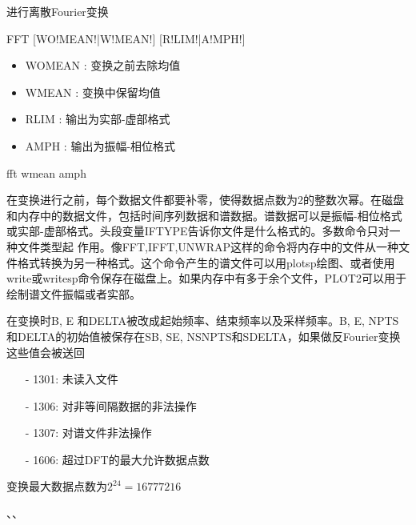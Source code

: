 \label{cmd:fft}

进行离散Fourier变换

\begin{SACSTX}
FFT [WO!MEAN!|W!MEAN!] [R!LIM!|A!MPH!]
\end{SACSTX}

\begin{itemize}
\item WOMEAN :  变换之前去除均值 
\item WMEAN : 变换中保留均值 
\item RLIM : 输出为实部-虚部格式
\item AMPH : 输出为振幅-相位格式
\end{itemize}

\begin{SACDFT}
fft wmean amph
\end{SACDFT}

在变换进行之前，每个数据文件都要补零，使得数据点数为2的整数次幂。在磁盘和内存中的数据文件，包括时间序列数据和谱数据。谱数据可以是振幅-相位格式或实部-虚部格式。头段变量IFTYPE告诉你文件是什么格式的。多数命令只对一种文件类型起	作用。像FFT,IFFT,UNWRAP这样的命令将内存中的文件从一种文件格式转换为另一种格式。这个命令产生的谱文件可以用plotsp绘图、或者使用write或writesp命令保存在磁盘上。如果内存中有多于余个文件，PLOT2可以用于绘制谱文件振幅或者实部。

在变换时B, E 和DELTA被改成起始频率、结束频率以及采样频率。B, E, NPTS和DELTA的初始值被保存在SB, SE, NSNPTS和SDELTA，如果做反Fourier变换这些值会被送回

\begin{itemize}
\item[-]1301: 未读入文件
\item[-]1306: 对非等间隔数据的非法操作
\item[-]1307: 对谱文件非法操作
\item[-]1606: 超过DFT的最大允许数据点数
\end{itemize}

变换最大数据点数为$2^{24}=16777216$

、、
